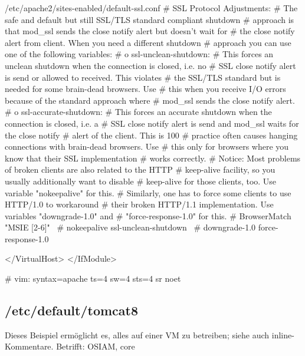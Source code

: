 \documentclass{tarentanleitung}
\begin{document}
\begin{lstdump}[tabsize=2]{/etc/apache2/sites-enabled/default-ssl.conf}
		#   SSL Protocol Adjustments:
		#   The safe and default but still SSL/TLS standard compliant shutdown
		#   approach is that mod_ssl sends the close notify alert but doesn't wait for
		#   the close notify alert from client. When you need a different shutdown
		#   approach you can use one of the following variables:
		#   o ssl-unclean-shutdown:
		#	 This forces an unclean shutdown when the connection is closed, i.e. no
		#	 SSL close notify alert is send or allowed to received.  This violates
		#	 the SSL/TLS standard but is needed for some brain-dead browsers. Use
		#	 this when you receive I/O errors because of the standard approach where
		#	 mod_ssl sends the close notify alert.
		#   o ssl-accurate-shutdown:
		#	 This forces an accurate shutdown when the connection is closed, i.e. a
		#	 SSL close notify alert is send and mod_ssl waits for the close notify
		#	 alert of the client. This is 100%
		#	 practice often causes hanging connections with brain-dead browsers. Use
		#	 this only for browsers where you know that their SSL implementation
		#	 works correctly.
		#   Notice: Most problems of broken clients are also related to the HTTP
		#   keep-alive facility, so you usually additionally want to disable
		#   keep-alive for those clients, too. Use variable "nokeepalive" for this.
		#   Similarly, one has to force some clients to use HTTP/1.0 to workaround
		#   their broken HTTP/1.1 implementation. Use variables "downgrade-1.0" and
		#   "force-response-1.0" for this.
		# BrowserMatch "MSIE [2-6]" \
		#		nokeepalive ssl-unclean-shutdown \
		#		downgrade-1.0 force-response-1.0

	</VirtualHost>
</IfModule>

# vim: syntax=apache ts=4 sw=4 sts=4 sr noet
\end{lstdump}

\subsection{/etc/default/tomcat8}\label{subsec:refcfg-tcdef}

Dieses Beispiel ermöglicht es, alles auf einer VM zu betreiben;
siehe auch inline-Kommentare. Betrifft: OSIAM, core
\end{document}
